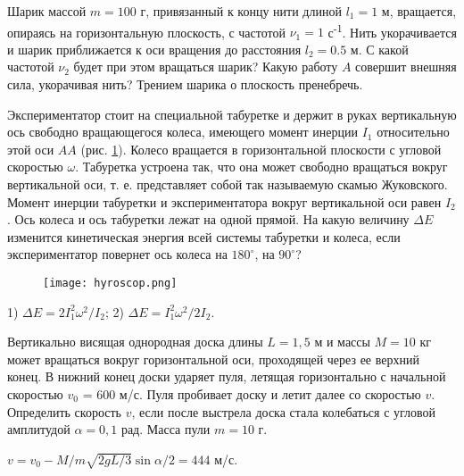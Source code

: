 \begin{ex}
Шарик массой $m = 100$ г, привязанный к концу нити длиной $l_1 = 1$ м, вращается, опираясь на горизонтальную плоскость, с частотой $\nu_1 = 1$ с\textsuperscript{-1}. Нить укорачивается и шарик приближается к оси вращения до расстояния $l_2 = 0.5$ м. С какой частотой $\nu_2$ будет при этом вращаться шарик? Какую работу $A$ совершит внешняя сила, укорачивая нить? Трением шарика о плоскость пренебречь.
\end{ex}	

\begin{ex} %
Экспериментатор стоит на специальной табуретке и держит в руках вертикальную ось свободно вращающегося колеса, имеющего момент инерции $I_1$ относительно этой оси $AA$ (рис. \ref{hyroscop}). Колесо вращается в горизонтальной плоскости с угловой скоростью $\omega$. Табуретка устроена так, что она может свободно вращаться вокруг вертикальной оси, т. е. представляет собой так называемую скамью Жуковского. Момент инерции табуретки и экспериментатора вокруг вертикальной оси равен $I_2$. Ось колеса и ось табуретки лежат на одной прямой. На какую величину $\Delta E$ изменится кинетическая энергия всей системы табуретки и колеса, если экспериментатор повернет ось колеса на $180^{\circ}$, на $90^{\circ}$?

\begin{figure}[h]
\centering
\texttt{[image: hyroscop.png]}
\caption{}
\label{hyroscop}
\end{figure}

\begin{ans}
1) $\Delta E = 2I_1^2\omega^2/I_2$; 2) $\Delta E = I_1^2\omega^2/2I_2$.
\end{ans}
\end{ex}	

\complexProblems

\begin{ex} %
Вертикально висящая однородная доска длины $L = 1,5$ м и массы $M = 10$ кг может вращаться вокруг горизонтальной оси, проходящей через ее верхний конец. В нижний конец доски ударяет пуля, летящая горизонтально с начальной скоростью $v_0$ = 600 м/с. Пуля пробивает доску и летит далее со скоростью $v$. Определить скорость $v$, если после выстрела доска стала колебаться с угловой амплитудой $\alpha  = 0,1$ рад. Масса пули $m = 10$ г.
\begin{ans}
$v = v_0 -M/m \sqrt{2gL/3} \sin \alpha /2 = 444$ м/с.
\end{ans}
\end{ex}	


